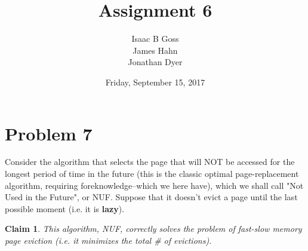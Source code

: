 \documentclass{article}
\author{Isaac B Goss\\ James Hahn\\ Jonathan Dyer}
\title{Assignment 6}
\date{Friday, September 15, 2017}
\newtheorem{thm}{Claim}
\providecommand{\prob}[1]{\section*{Problem #1}}
\begin{document}
\maketitle

	\prob{7}
	Consider the algorithm that selects the page that will NOT be accessed for the longest period of time in the future
	(this is the classic optimal page-replacement algorithm, requiring foreknowledge--which we here have), which we shall call "Not Used in the Future", or NUF. Suppose that it doesn't evict a page until the last possible moment (i.e. it is \textbf{lazy}).

	\begin{thm}
		This algorithm, NUF, correctly solves the problem of fast-slow memory page eviction (i.e. it minimizes the total \# of evictions).
	\end{thm}
	
\end{document}

